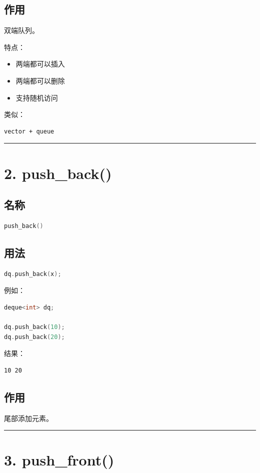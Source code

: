 \documentclass[10pt,twocolumn]{extarticle}
\begin{document}
\subsection{作用}
双端队列。

特点：
\begin{itemize}
    \item 两端都可以插入
    \item 两端都可以删除
    \item 支持随机访问
\end{itemize}

类似：
\begin{lstlisting}
vector + queue
\end{lstlisting}

\noindent\rule{\linewidth}{0.4pt}

\section{2. push\_back()}

\subsection{名称}
\begin{lstlisting}[language=C++]
push_back()
\end{lstlisting}

\subsection{用法}
\begin{lstlisting}[language=C++]
dq.push_back(x);
\end{lstlisting}
例如：
\begin{lstlisting}[language=C++]
deque<int> dq;

dq.push_back(10);
dq.push_back(20);
\end{lstlisting}
结果：
\begin{lstlisting}
10 20
\end{lstlisting}

\subsection{作用}
尾部添加元素。

\noindent\rule{\linewidth}{0.4pt}

\section{3. push\_front()}
\end{document}
